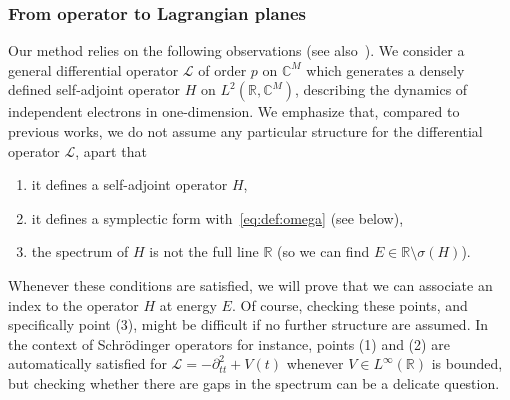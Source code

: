 \documentclass[11pt]{amsart}
\numberwithin{equation}{section} %
\newcommand\1{{\mathds 1}}
\def\C{{\mathbb C}}
\def\R{{\mathbb R}}
\def\cL{{\mathcal L}}
\begin{document}
\subsubsection{From operator to Lagrangian planes}

Our method relies on the following observations (see also~\cite{Gon-20, Gon-23}). We consider a general differential operator $\cL$ of order $p$ on $\C^M$ which generates a densely defined self-adjoint operator $H$ on $L^2(\R, \C^M)$, describing the dynamics of independent electrons in one-dimension. We emphasize that, compared to previous works, we do not assume any particular structure for the differential operator $\cL$, apart that
\begin{enumerate}
    \item it defines a self-adjoint operator $H$,
    \item it defines a symplectic form with~\eqref{eq:def:omega} (see below),
    \item the spectrum of $H$ is not the full line $\R$ (so we can find $E \in \R \setminus \sigma(H)$).
\end{enumerate}
Whenever these conditions are satisfied, we will prove that we can associate an index to the operator $H$ at energy $E$. Of course, checking these points, and specifically point (3), might be difficult if no further structure are assumed. In the context of Schrödinger operators for instance, points (1) and (2) are automatically satisfied for $\cL = - \partial_{tt}^2 + V(t)$ whenever $V \in L^\infty (\R)$ is bounded, but checking whether there are gaps in the spectrum can be a delicate question.

\medskip
\end{document}

